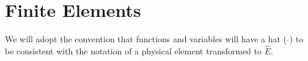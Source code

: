 \chapter{Finite Elements}
We will adopt the convention that functions and variables 
will have a hat ($\,\hat{}\,$) to be consistent with the notation
of a physical element transformed to $\hat E$.



